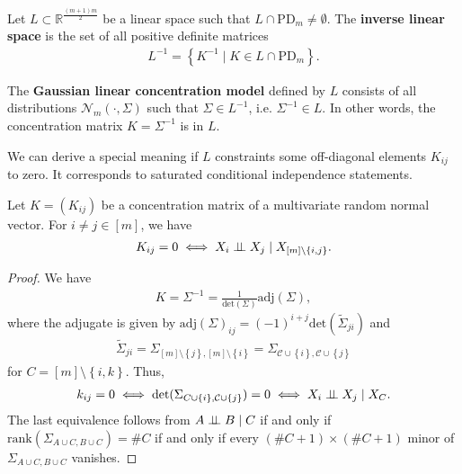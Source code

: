 \begin{defi}
  Let \( L \subset \mathbb{R}^{\frac{(m+1)m}{2}} \) be a linear space such that \( L \cap \mathrm{PD}_m \neq \emptyset \). The \textbf{inverse linear space} is the set of all positive definite matrices 
  \begin{align*}
    L^{-1} = \left\{ K^{-1} \mid K \in L \cap \mathrm{PD}_m \right\}.
  \end{align*}
\end{defi}

\begin{defi}
  The \textbf{Gaussian linear concentration model} defined by \( L \) consists of all distributions \( \mathcal{N}_m(\cdot, \Sigma) \) such that \( \Sigma \in L^{-1} \), i.e. \( \Sigma^{-1} \in L \). In other words, the concentration matrix \( K = \Sigma^{-1} \) is in \( L \).
\end{defi}

We can derive a special meaning if \( L \) constraints some off-diagonal elements \( K_{ij} \) to zero. It corresponds to saturated conditional independence statements.

\begin{prop}
  Let \(  K = (K_{ij}) \) be a concentration matrix of a multivariate random normal vector. For \( i \neq j \in [m] \), we have 
  \begin{align*}
    K_{ij} = 0 \iff X_i \perp \!\!\! \perp X_j \mid X_{[m] \setminus \left\{ i,j \right\}}.
  \end{align*}
\end{prop}

\begin{proof}
  We have 
  \begin{align*}
    K = \Sigma^{-1} = \frac{1}{\mathrm{det}(\Sigma)} \mathrm{adj}(\Sigma),
  \end{align*}
  where the adjugate is given by \( \mathrm{adj}(\Sigma)_{ij} = (-1)^{i + j} \mathrm{det}(\tilde \Sigma_{ji}) \) and 
  \begin{align*}
    \tilde \Sigma_{ji} = \Sigma_{[m] \setminus \left\{ j\right\}, [m] \setminus \left\{ i \right\}} = \Sigma_{\mathcal{C} \cup \left\{ i \right\}, \mathcal{C} \cup \left\{ j \right\}}
  \end{align*}
  for \( {C} = [m] \setminus \left\{ i,k \right\} \). Thus, 
  \begin{align*}
    k_{ij} = 0 \iff \mathrm{det}( \Sigma_{{C} \cup \left\{ i \right\}, \mathcal{C} \cup \left\{ j \right\}}) =0 \iff X_i \perp \!\!\! \perp X_j \mid X_{
  {C}
    }.
  \end{align*}
  The last equivalence follows from \( A \perp \!\!\! \perp B \mid C \) if and only if \( \mathrm{rank}(\Sigma_{A \cup C, B \cup C}) = \# C \) if and only if every \( (\# C + 1) \times( \# C + 1) \) minor of \( \Sigma_{A \cup C, B \cup C} \) vanishes.
\end{proof}

